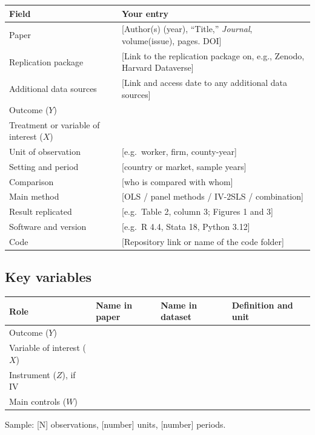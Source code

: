 \documentclass[12pt,a4paper]{article}
\renewcommand{\arraystretch}{1.25}
\begin{document}
{\renewcommand{\arraystretch}{1.4}%
\begin{tabularx}{\textwidth}{@{}>{\raggedright\arraybackslash}p{}L@{}}
\toprule
Field & Your entry \\
\midrule
Paper & [Author(s) (year), ``Title,'' \textit{Journal}, volume(issue), pages. DOI] \\
Replication package & [Link to the replication package on, e.g., Zenodo, Harvard Dataverse] \\
Additional data sources & [Link and access date to any additional data sources] \\
Outcome ($Y$) & \\
Treatment or variable of interest ($X$) & \\
Unit of observation & [e.g.\ worker, firm, county-year] \\
Setting and period & [country or market, sample years] \\
Comparison & [who is compared with whom] \\
Main method & [OLS / panel methods / IV-2SLS / combination] \\
Result replicated & [e.g.\ Table 2, column 3; Figures 1 and 3] \\
Software and version & [e.g.\ R 4.4, Stata 18, Python 3.12] \\
Code & [Repository link or name of the code folder] \\
\bottomrule
\end{tabularx}}

\subsection{Key variables}

{\renewcommand{\arraystretch}{1.4}%
\begin{tabularx}{\textwidth}{@{}>{\raggedright\arraybackslash}p{}
  >{\raggedright\arraybackslash}p{}
  >{\raggedright\arraybackslash}p{}
  L@{}}
\toprule
Role & Name in paper & Name in dataset & Definition and unit \\
\midrule
Outcome ($Y$) & & & \\
Variable of interest ($X$) & & & \\
Instrument ($Z$), if IV & & & \\
Main controls ($W$) & & & \\
\bottomrule
\end{tabularx}}

\medskip\noindent
Sample: [N] observations, [number] units, [number] periods.
\end{document}
